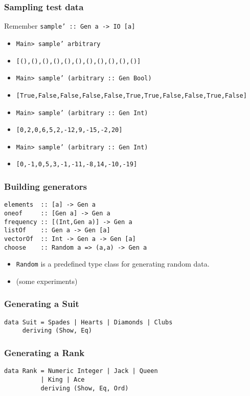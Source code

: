 \documentclass{beamer}
\begin{document}
\begin{frame}[fragile]
  \frametitle{Sampling test data}
  Remember \texttt{sample'  :: Gen a -> IO [a]}
  \footnotesize
  \begin{itemize}[<+->]
  \item \texttt{Main> sample' arbitrary}
  \item \texttt{[(),(),(),(),(),(),(),(),(),(),()]}
  \item \texttt{Main> sample' (arbitrary :: Gen Bool)}
  \item \texttt{[True,False,False,False,False,True,True,False,False,True,False]}
  \item \texttt{Main> sample' (arbitrary :: Gen Int)}
  \item \texttt{[0,2,0,6,5,2,-12,9,-15,-2,20]}
  \item \texttt{Main> sample' (arbitrary :: Gen Int)}
  \item \texttt{[0,-1,0,5,3,-1,-11,-8,14,-10,-19]}
  \end{itemize}
\end{frame}
\begin{frame}[fragile]
  \frametitle{Building generators}
\begin{verbatim}
elements  :: [a] -> Gen a
oneof     :: [Gen a] -> Gen a
frequency :: [(Int,Gen a)] -> Gen a
listOf    :: Gen a -> Gen [a]
vectorOf  :: Int -> Gen a -> Gen [a]
choose    :: Random a => (a,a) -> Gen a
\end{verbatim}
  \begin{itemize}
  \item \texttt{Random} is a predefined type class for generating random data.
  \item (some experiments)
  \end{itemize}
\end{frame}
\begin{frame}[fragile]
  \frametitle{Generating a Suit}
\begin{verbatim}
data Suit = Spades | Hearts | Diamonds | Clubs
     deriving (Show, Eq)
\end{verbatim}
\end{frame}
\begin{frame}[fragile]
  \frametitle{Generating a Rank}
\begin{verbatim}
data Rank = Numeric Integer | Jack | Queen
          | King | Ace
          deriving (Show, Eq, Ord)
\end{verbatim}
\end{frame}
\end{document}
